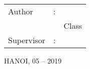 \begin{titlepage}
\begin{center}
		\vspace{40pt}

		\raggedleft
		\begin{minipage}{0.6\linewidth}
			\fontsize{14}{16pt}\selectfont
			\begin{tabular}{ l c l }
			Author & : & \textbf{\thesisAuthor}\\
					& & Class \studentClass\\
			Supervisor & : & \textbf{\supervisor}
			\end{tabular}
		\end{minipage}
		\vfill
		\centering
		\fontsize{16}{16pt}\selectfont
		\MakeUppercase{Hanoi, 05 -- 2019}
	\end{center}
	\cleardoublepage
\end{titlepage}
